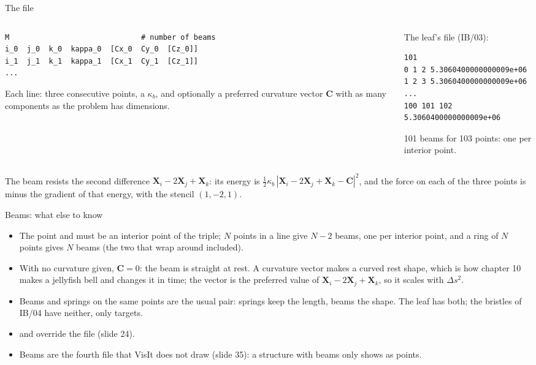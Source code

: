 \documentclass[aspectratio=169,11pt]{beamer}
\begin{document}
\begin{frame}[fragile]{The  file}
\begin{columns}[T,onlytextwidth]
\begin{column}{0.5\textwidth}
\begin{lstlisting}[style=data]
M                              # number of beams
i_0  j_0  k_0  kappa_0  [Cx_0  Cy_0  [Cz_0]]
i_1  j_1  k_1  kappa_1  [Cx_1  Cy_1  [Cz_1]]
...
\end{lstlisting}
\small Each line: three consecutive points, a  $\kappa_b$, and optionally a preferred curvature vector $\mathbf{C}$ with as many components as the problem has dimensions.
\end{column}
\begin{column}{0.48\textwidth}
\small The leaf's file (IB/03):
\begin{lstlisting}[style=tiny]
101
0 1 2 5.3060400000000009e+06
1 2 3 5.3060400000000009e+06
...
100 101 102 5.3060400000000009e+06
\end{lstlisting}
101 beams for 103 points: one per interior point.
\end{column}
\end{columns}
\vspace{2mm}
\small The beam resists the second difference $\mathbf{X}_i - 2\mathbf{X}_j + \mathbf{X}_k$: its energy is $\tfrac{1}{2}\kappa_b\,|\mathbf{X}_i - 2\mathbf{X}_j + \mathbf{X}_k - \mathbf{C}|^2$, and the force on each of the three points is minus the gradient of that energy, with the stencil $(1, -2, 1)$.
\end{frame}

\begin{frame}{Beams: what else to know}
\begin{itemize}
  \item The  point and must be an interior point of the triple; $N$ points in a line give $N-2$ beams, one per interior point, and a ring of $N$ points gives $N$ beams (the two that wrap around included).
  \item With no curvature given, $\mathbf{C} = 0$: the beam is straight at rest. A curvature vector makes a curved rest shape, which is how chapter 10 makes a jellyfish bell and changes it in time; the vector is the preferred value of $\mathbf{X}_i - 2\mathbf{X}_j + \mathbf{X}_k$, so it scales with $\Delta s^2$.
  \item Beams and springs on the same points are the usual pair: springs keep the length, beams the shape. The leaf has both; the bristles of IB/04 have neither, only targets.
  \item {} and  override the file (slide 24).
  \item Beams are the fourth file that VisIt does not draw (slide 35): a structure with beams only shows as points.
\end{itemize}
\end{frame}
\end{document}
